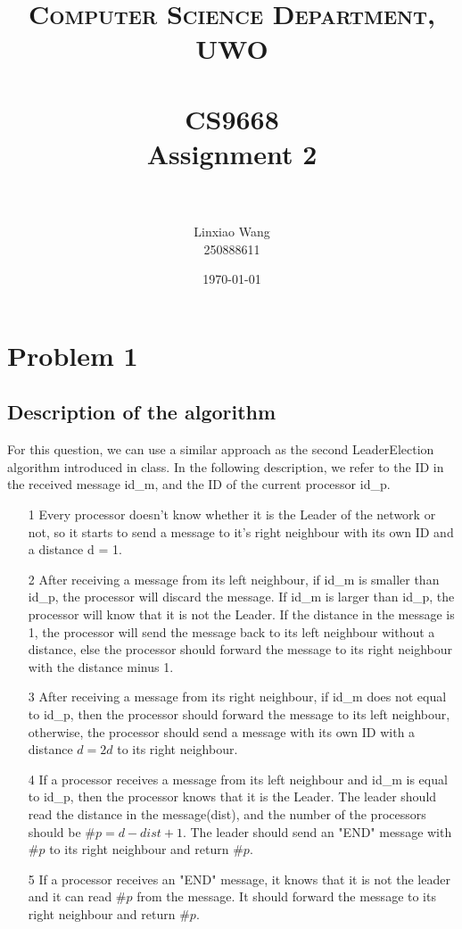 \documentclass[paper=a4, fontsize=11pt]{scrartcl} %
\title{	
\normalfont \normalsize 
\textsc{Computer Science Department, UWO} \\ [25pt] %
\horrule{0.5pt} \\[0.4cm] %
\huge CS9668\\
Assignment 2 \\ %
\horrule{2pt} \\[0.5cm] %
}
\author{Linxiao Wang\\
	250888611} %
\date{\normalsize\today} %
\numberwithin{equation}{section} %
\numberwithin{figure}{section} %
\numberwithin{table}{section} %
\begin{document}
\maketitle %


\section*{Problem 1}
\subsection*{Description of the algorithm}
For this question, we can use a similar approach as the second  LeaderElection algorithm introduced in class. In the following description, we refer to the ID in the received message id\_m, and the ID of the current processor id\_p.
\begin{itemize}
	\item[1] Every processor doesn't know whether it is the Leader of the network or not, so it starts to send a message to it's right neighbour with its own ID and a distance d = 1.
	\item[2] After receiving a message from its left neighbour, if id\_m is smaller than id\_p, the processor will discard the message. If id\_m is larger than id\_p, the processor will know that it is not the Leader. If the distance in the message is 1, the processor will send the message back to its left neighbour without a distance, else the processor should forward the message to its right neighbour with the distance minus 1.
	\item[3] After receiving a message from its right neighbour, if id\_m does not equal to id\_p, then the processor should forward the message to its left neighbour, otherwise, the processor should send a message with its own ID with a distance $d = 2d$ to its right neighbour.
	\item[4] If a processor receives a message from its left neighbour and id\_m is equal to id\_p, then the processor knows that it is the Leader. The leader should read the distance in the message(dist), and the number of the processors should be $\#p = d - dist + 1$.
	The leader should send an "END" message with $\#p$ to its right neighbour and return $\#p$.
	\item[5] If a processor receives an "END" message, it knows that it is not the leader and it can read $\#p$ from the message. It should forward the message to its right neighbour and return $\#p$.
\end{itemize}
\end{document}
